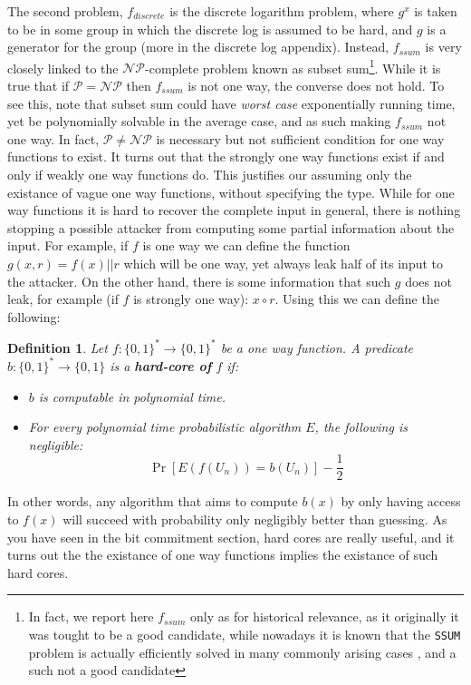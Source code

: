 \documentclass{article}
\newtheorem{definition}{Definition}
\begin{document}
The second problem, $f_{discrete}$ is the discrete logarithm problem, where $g^x$ is taken to be in some group in which the discrete log is assumed 
to be hard, and $g$ is a generator for the group (more in the discrete log appendix).
Instead, $f_{ssum}$ is very closely linked to the $\mathcal{NP}$-complete problem known as subset sum\footnote{In fact, we
report here $f_{ssum}$ only as for historical relevance, as it originally it was tought to be a good candidate, while nowadays 
it is known that the \texttt{SSUM} problem is actually efficiently solved in many commonly arising cases \cite{lagariasSolvingLowdensitySubset1985}, and a such
not a good candidate}. 
While it is true that if $\mathcal{P} = \mathcal{NP}$ then $f_{ssum}$ is not one way, the converse does not hold. To see this, note that subset sum could have \textit{worst case} exponentially running time, yet be polynomially solvable in the average case, and as such making $f_{ssum}$ not one way.
In fact, $\mathcal{P} \neq \mathcal{NP}$ is necessary but not sufficient condition for one way functions to exist.
It turns out \cite{goldreichFoundationsCryptographyVol2007} that the strongly one way functions exist if and only if weakly one way functions do. This justifies our assuming only the existance of vague one way functions, without specifying the type.
While for one way functions it is hard to recover the complete input in general, there is nothing stopping a possible attacker from computing some partial information about the input.
For example, if $f$ is one way we can define the function $g(x, r) = f(x) || r$ which will be one way, yet always leak half of its input to the attacker.
On the other hand, there is some information that such $g$ does not leak, for example (if $f$ is strongly one way): $x \circ r$. 
Using this we can define the following:
\begin{definition}
    Let $f: \{0, 1\}^* \to \{0, 1\}^*$ be a one way function. A predicate $b: \{0,1\}^* \to \{0, 1\}$ is 
    a \textbf{hard-core of} $f$ if:
    \begin{itemize}
        \item $b$ is computable in polynomial time.
        \item For every polynomial time probabilistic algorithm $E$, the following is negligible:
        \[ \Pr[E(f(U_n)) = b(U_n)] - \frac{1}{2} \]
    \end{itemize}
\end{definition}
In other words, any algorithm that aims to compute $b(x)$ by only having access to $f(x)$ will succeed with probability
only negligibly better than guessing. As you have seen in the bit commitment section, hard cores are really useful, and it turns out \cite{goldreichFoundationsCryptographyVol2007} the the existance of one way functions implies the existance of such hard cores. 
\end{document}
